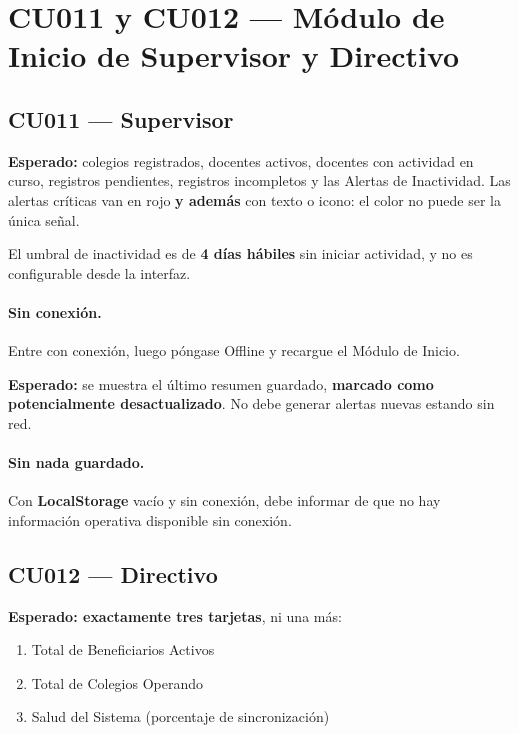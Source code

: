 \documentclass[11pt,a4paper]{article}
\begin{document}
\newpage
\section{CU011 y CU012 --- Módulo de Inicio de Supervisor y Directivo}

\subsection{CU011 --- Supervisor}

\textbf{Esperado:} colegios registrados, docentes activos, docentes con
actividad en curso, registros pendientes, registros incompletos y las Alertas de
Inactividad. Las alertas críticas van en rojo \textbf{y además} con texto o
icono: el color no puede ser la única señal.

El umbral de inactividad es de \textbf{4 días hábiles} sin iniciar actividad, y
no es configurable desde la interfaz.

\paragraph{Sin conexión.} Entre con conexión, luego póngase Offline y recargue
el Módulo de Inicio.

\textbf{Esperado:} se muestra el último resumen guardado, \textbf{marcado como
potencialmente desactualizado}. No debe generar alertas nuevas estando sin red.

\paragraph{Sin nada guardado.} Con \textbf{LocalStorage} vacío y sin conexión,
debe informar de que no hay información operativa disponible sin conexión.

\subsection{CU012 --- Directivo}

\textbf{Esperado: exactamente tres tarjetas}, ni una más:

\begin{enumerate}
  \item Total de Beneficiarios Activos
  \item Total de Colegios Operando
  \item Salud del Sistema (porcentaje de sincronización)
\end{enumerate}
\end{document}
